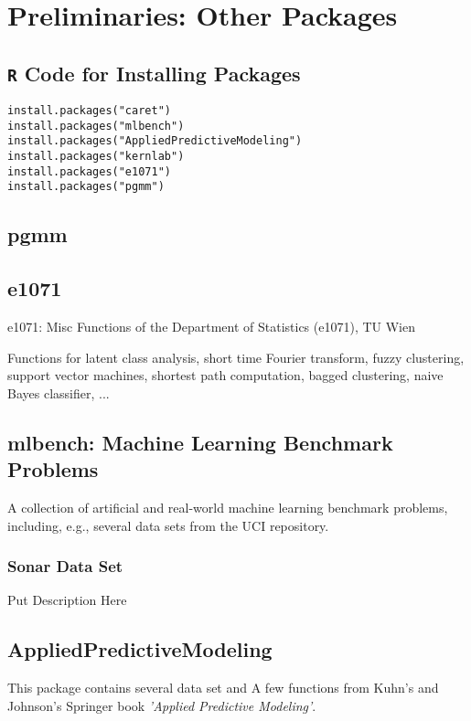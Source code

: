 \documentclass[caret-main.tex]{subfiles}
\begin{document}
\section{Preliminaries: Other Packages}

\subsection{\texttt{R} Code for Installing Packages}

\begin{framed}
\begin{verbatim}
install.packages("caret")
install.packages("mlbench")
install.packages("AppliedPredictiveModeling")
install.packages("kernlab")
install.packages("e1071")
install.packages("pgmm")
\end{verbatim}
\end{framed}

\subsection{pgmm}

\subsection{e1071}
e1071: Misc Functions of the Department of Statistics (e1071), TU Wien

Functions for latent class analysis, short time Fourier transform, fuzzy clustering, support vector machines, shortest path computation, bagged clustering, naive Bayes classifier, ...

\subsection{mlbench: Machine Learning Benchmark Problems}

A collection of artificial and real-world machine learning benchmark problems, including, e.g., several data sets from the UCI repository.


\subsubsection{Sonar Data Set}

Put Description Here
\newpage
\subsection{AppliedPredictiveModeling}
This package contains several data set and A few functions from Kuhn's and Johnson's Springer book \emph{'Applied Predictive Modeling'}.
\end{document}
